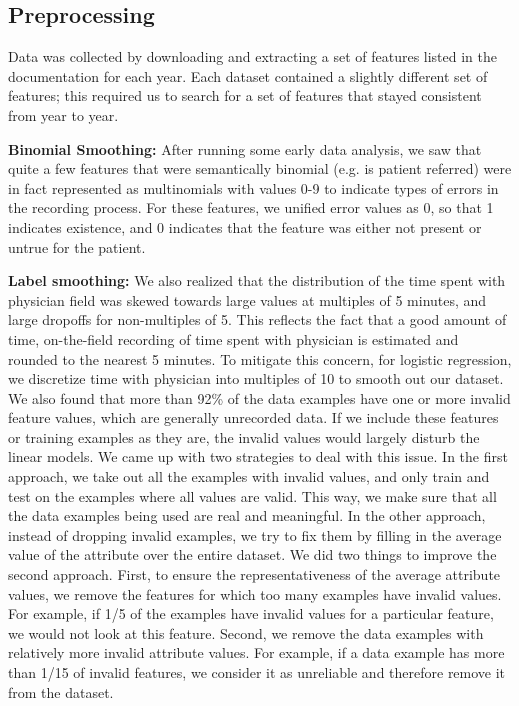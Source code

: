 \documentclass[english]{article}
\begin{document}
\subsection{Preprocessing}

Data was collected by downloading and extracting a set of features listed in the documentation for each year.
Each dataset contained a slightly different set of features; this required us to search for a set of features that stayed consistent from year to year.

{\bf Binomial Smoothing:}
After running some early data analysis, we saw that quite a few features that were semantically binomial (e.g. is patient referred) were in fact represented as multinomials with values 0-9 to indicate types of errors in the recording process.
For these features, we unified error values as 0, so that 1 indicates existence, and 0 indicates that the feature was either not present or untrue for the patient.

{\bf Label smoothing:}
We also realized that the distribution of the time spent with physician field was skewed towards large values at multiples of 5 minutes, and large dropoffs for non-multiples of 5.
This reflects the fact that a good amount of time, on-the-field recording of time spent with physician is estimated and rounded to the nearest 5 minutes.
To mitigate this concern, for logistic regression, we discretize time with physician into multiples of 10 to smooth out our dataset.
We also found that more than 92\% of the data examples have one or more invalid feature values, which are generally unrecorded data.
If we include these features or training examples as they are, the invalid values would largely disturb the linear models.
We came up with two strategies to deal with this issue.
In the first approach, we take out all the examples with invalid values, and only train and test on the examples where all values are valid. This way, we make sure that all the data examples being used are real and meaningful.
In the other approach, instead of dropping invalid examples, we try to fix them by filling in the average value of the attribute over the entire dataset.
We did two things to improve the second approach. First, to ensure the representativeness of the average attribute values, we remove the features for which too many examples have invalid values. For example, if 1/5 of the examples have invalid values for a particular feature, we would not look at this feature.
Second, we remove the data examples with relatively more invalid attribute values. For example, if a data example has more than 1/15 of invalid features, we consider it as unreliable and therefore remove it from the dataset.
\end{document}
